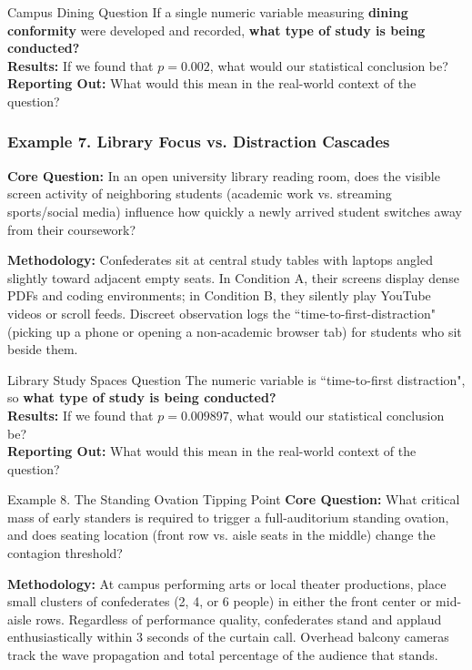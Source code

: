 \documentclass{beamer}
\begin{document}
\begin{frame}{Campus Dining Question}
If a single numeric variable measuring \textbf{dining conformity} were developed and recorded, \textbf{what type of study is being conducted?}\\[9mm]
\pause
\textbf{Results:} If we found that $p = 0.002$, what would our statistical conclusion be?\\[9mm]
\pause
\textbf{Reporting Out:} What would this mean in the real-world context of the question? 
\vspace{25mm}
\end{frame}

\begin{frame}\frametitle{Example 7. Library Focus vs. Distraction Cascades}
\textbf{Core Question:} In an open university library reading room, does the visible screen activity of neighboring students (academic work vs. streaming sports/social media) influence how quickly a newly arrived student switches away from their coursework?

\pause
\textbf{Methodology:} Confederates sit at central study tables with laptops angled slightly toward adjacent empty seats. In Condition A, their screens display dense PDFs and coding environments; in Condition B, they silently play YouTube videos or scroll feeds. Discreet observation logs the ``time-to-first-distraction" (picking up a phone or opening a non-academic browser tab) for students who sit beside them.

\vspace{15mm}
\end{frame}

\begin{frame}{Library Study Spaces Question}
The numeric variable is ``time-to-first distraction", so \textbf{what type of study is being conducted?}\\[9mm]
\pause
\textbf{Results:} If we found that $p = 0.009897$, what would our statistical conclusion be?\\[9mm]
\pause
\textbf{Reporting Out:} What would this mean in the real-world context of the question? 
\vspace{25mm}
\end{frame}

\begin{frame}{Example 8. The Standing Ovation Tipping Point}
\textbf{Core Question:} What critical mass of early standers is required to trigger a full-auditorium standing ovation, and does seating location (front row vs. aisle seats in the middle) change the contagion threshold?

\pause
\textbf{Methodology:} At campus performing arts or local theater productions, place small clusters of confederates (2, 4, or 6 people) in either the front center or mid-aisle rows. Regardless of performance quality, confederates stand and applaud enthusiastically within 3 seconds of the curtain call. Overhead balcony cameras track the wave propagation and total percentage of the audience that stands.
\vspace{23mm}
\end{frame}
\end{document}
